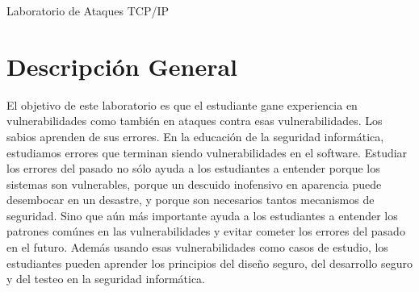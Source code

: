 

\newcommand{\commonfolder}{../../common-files}





\newcommand{\telnet} {\texttt{telnet}\xspace}
\newcommand{\tcpFigs}{./Figs}




\setcounter{task}{1}
\newcommand{\mytask} {\bf {\noindent \arabic{task}} \addtocounter{task}{1} \,}



\begin{center}
{\LARGE Laboratorio de Ataques TCP/IP}
\end{center}




\section{Descripción General}

El objetivo de este laboratorio es que el estudiante gane experiencia en vulnerabilidades como también en ataques contra esas vulnerabilidades. Los sabios aprenden de sus errores. En la educación de la seguridad informática, estudiamos errores que terminan siendo vulnerabilidades en el software. Estudiar los errores del pasado no sólo ayuda a los estudiantes a entender porque los sistemas son vulnerables, porque un descuido inofensivo en aparencia puede desembocar en un desastre, y porque son necesarios tantos mecanismos de seguridad. Sino que aún más importante ayuda a los estudiantes a entender los patrones comúnes en las vulnerabilidades y evitar cometer los errores del pasado en el futuro. Además usando esas vulnerabilidades como casos de estudio, los estudiantes pueden aprender los principios del diseño seguro, del desarrollo seguro y del testeo en la seguridad informática.

